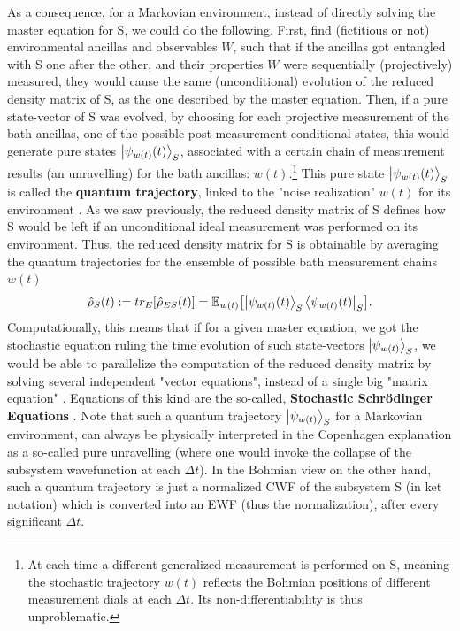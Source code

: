 \documentclass[11pt, a4paper]{article} %
\begin{document}
As a consequence, for a Markovian environment, instead of directly solving the master equation for S, we could do the following. First, find (fictitious or not) environmental ancillas and observables $W$, such that if the ancillas got entangled with S one after the other, and their properties $W$ were sequentially (projectively) measured, they would cause the same (unconditional) evolution of the reduced density matrix of S, as the one described by the master equation. Then, if a pure state-vector of S was evolved, by choosing for each projective measurement of the bath ancillas, one of the possible post-measurement conditional states, this would generate pure states $\ket{\psi_{w(t)}(t)}_S$, associated with a certain chain of measurement results (an unravelling) for the bath ancillas: $w(t)$.\footnote{At each time a different generalized measurement is performed on S, meaning the stochastic trajectory $w(t)$ reflects the Bohmian positions of different measurement dials at each $\Delta t$. Its non-differentiability is thus unproblematic.} This pure state $\ket{\psi_{w(t)}(t)}_S$ is called the {\bf quantum trajectory}, linked to the "noise realization" $w(t)$ for its environment \cite{Generalized, MarkovianityDefs, QuantumTrajs}. As we saw previously, the reduced density matrix of S defines how S would be left if an unconditional ideal measurement was performed on its environment. Thus, the reduced density matrix for S is obtainable by averaging the quantum trajectories for the ensemble of possible bath measurement chains $w(t)$ \cite{MarkovianityDefs,QuantumTrajs}\vspace{-0.21cm}
\begin{equation}
\hat{\rho}_S(t):=tr_{E}[\hat{\rho}_{ES}(t)]=\mathbb{E}_{w(t)}\qty[\ket{\psi_{w(t)}(t)}_S\bra{\psi_{w(t)}(t)}_S]. \vspace{-0.12cm}
\end{equation}
Computationally, this means that if for a given master equation, we got the stochastic equation ruling the time evolution of such state-vectors $\ket{\psi_{w(t)}}_S$, we would be able to parallelize the computation of the reduced density matrix by solving several independent "vector equations", instead of a single big "matrix equation" \cite{MarkovianityDefs, QuantumTrajs}. Equations of this kind are the so-called, {\bf Stochastic Schrödinger Equations} \cite{Generalized, continousMeas}. Note that such a quantum trajectory $\ket{\psi_{w(t)}}_S$ for a Markovian environment, can always be physically interpreted in the Copenhagen explanation as a so-called pure unravelling \cite{MarkovianityDefs} (where one would invoke the collapse of the subsystem wavefunction at each $\Delta t$). In the Bohmian view on the other hand, such a quantum trajectory is just a normalized CWF of the subsystem S (in ket notation) which is converted into an EWF (thus the normalization), after every significant $\Delta t$.\vspace{-0.05cm}
 
\end{document}
